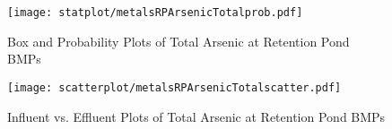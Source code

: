         \begin{figure}[hb]   %
            \centering
            \texttt{[image: statplot/metalsRPArsenicTotalprob.pdf]}
            \caption{Box and Probability Plots of Total Arsenic at Retention Pond BMPs}
        \end{figure}         %
        
        
        \begin{figure}[hb]   %
            \centering
            \texttt{[image: scatterplot/metalsRPArsenicTotalscatter.pdf]}
            \caption{Influent vs. Effluent Plots of Total Arsenic at Retention Pond BMPs}
        \end{figure}         %
        \clearpage
        